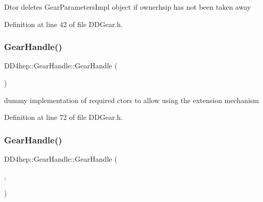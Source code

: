 D\textquotesingle{}tor deletes Gear\+Parameters\+Impl object if ownerhsip has not been taken away 

Definition at line 42 of file D\+D\+Gear.\+h.

\hypertarget{class_d_d4hep_1_1_gear_handle_a08d410c5f9ea89384c3166fe42f0bae8}{}\label{class_d_d4hep_1_1_gear_handle_a08d410c5f9ea89384c3166fe42f0bae8} 
\subsubsection{\texorpdfstring{Gear\+Handle()}{GearHandle()}\hspace{0.1cm}{\footnotesize\ttfamily [3/4]}}
{\footnotesize\ttfamily D\+D4hep\+::\+Gear\+Handle\+::\+Gear\+Handle (\begin{DoxyParamCaption}\item[{const \hyperlink{class_d_d4hep_1_1_geometry_1_1_det_element}{Geometry\+::\+Det\+Element} \&}]{ }\end{DoxyParamCaption})\hspace{0.3cm}{\ttfamily [inline]}}

dummy implementation of required c\textquotesingle{}tors to allow using the extension mechanism 

Definition at line 72 of file D\+D\+Gear.\+h.

\hypertarget{class_d_d4hep_1_1_gear_handle_a7b88ea01bf9e0fb58e7df2997c8825fb}{}\label{class_d_d4hep_1_1_gear_handle_a7b88ea01bf9e0fb58e7df2997c8825fb} 
\subsubsection{\texorpdfstring{Gear\+Handle()}{GearHandle()}\hspace{0.1cm}{\footnotesize\ttfamily [4/4]}}
{\footnotesize\ttfamily D\+D4hep\+::\+Gear\+Handle\+::\+Gear\+Handle (\begin{DoxyParamCaption}\item[{const \hyperlink{class_d_d4hep_1_1_gear_handle}{Gear\+Handle} \&}]{,  }\item[{const \hyperlink{class_d_d4hep_1_1_geometry_1_1_det_element}{Geometry\+::\+Det\+Element} \&}]{ }\end{DoxyParamCaption})\hspace{0.3cm}{\ttfamily [inline]}}



